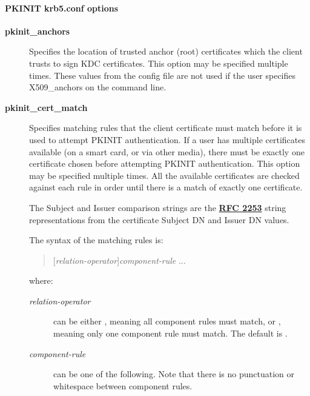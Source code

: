 \documentclass[letterpaper,10pt,english]{sphinxmanual}
\begin{document}
\paragraph{PKINIT krb5.conf options}
\label{admin/conf_files/krb5_conf:pkinit-krb5-conf-options}\begin{description}
\item[{\textbf{pkinit\_anchors}}] \leavevmode
Specifies the location of trusted anchor (root) certificates which
the client trusts to sign KDC certificates.  This option may be
specified multiple times.  These values from the config file are
not used if the user specifies X509\_anchors on the command line.

\item[{\textbf{pkinit\_cert\_match}}] \leavevmode
Specifies matching rules that the client certificate must match
before it is used to attempt PKINIT authentication.  If a user has
multiple certificates available (on a smart card, or via other
media), there must be exactly one certificate chosen before
attempting PKINIT authentication.  This option may be specified
multiple times.  All the available certificates are checked
against each rule in order until there is a match of exactly one
certificate.

The Subject and Issuer comparison strings are the \href{http://tools.ietf.org/html/rfc2253.html}{\textbf{RFC 2253}}
string representations from the certificate Subject DN and Issuer
DN values.

The syntax of the matching rules is:
\begin{quote}

{[}\emph{relation-operator}{]}\emph{component-rule} ...
\end{quote}

where:
\begin{description}
\item[{\emph{relation-operator}}] \leavevmode
can be either \code{\&\&}, meaning all component rules must match,
or \code{\textbar{}\textbar{}}, meaning only one component rule must match.  The
default is \code{\&\&}.

\item[{\emph{component-rule}}] \leavevmode
can be one of the following.  Note that there is no
punctuation or whitespace between component rules.
\begin{quote}

\end{quote}


\end{description}
\end{description}
\end{document}
